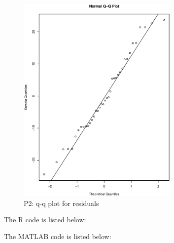 \documentclass[12pt]{article}
\begin{document}
\begin{figure}[ht!]
  \centering
  \includegraphics[width=0.7\textwidth]{qq2}
  \caption{P2: q-q plot for residuals \label{fig:qq2}}
\end{figure}

\appendix
\appendixpage
\addappheadtotoc

The R code is listed below:



The MATLAB code is listed below:


\end{document}
